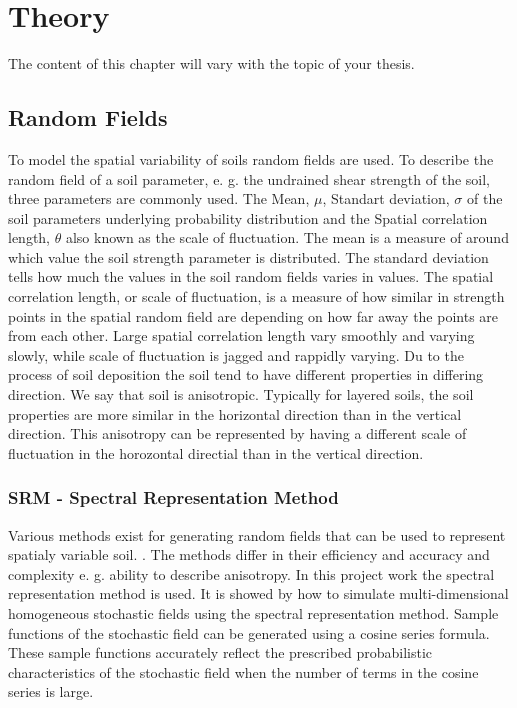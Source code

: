 \chapter[Theory]{Theory}
The content of this chapter will vary with the topic of your thesis. 

\section{Random Fields}

To model the spatial variability of soils random fields are used. To describe the random field of a soil parameter, e. g. the undrained shear strength of the soil, three parameters are commonly used. 
The Mean, $\mu$, Standart deviation, $\sigma$ of the soil parameters underlying probability distribution and the Spatial correlation length, $\theta$ also known as the scale of fluctuation.   
The mean is a measure of around which value the soil strength parameter is distributed. The standard deviation tells how much the values in the soil random fields varies in values. The spatial correlation length, or scale of fluctuation, is a measure of how similar in strength points in the spatial random field are depending on how far away the points are from each other. Large spatial correlation length vary smoothly and varying slowly, while scale of fluctuation is jagged and rappidly varying. 
Du to the process of soil deposition the soil tend to have different properties in differing direction. We say that soil is anisotropic. Typically for layered soils, the soil properties are more similar in the horizontal direction than in the vertical direction. This anisotropy can be represented by having a different scale of fluctuation in the horozontal directial than in the vertical direction.

\subsection{SRM - Spectral Representation Method}

Various methods exist for generating random fields that can be used to represent spatialy variable soil. \citep*[see e. g.][Chapter 6]{fenton2008risk}. The methods differ in their efficiency and accuracy and complexity e. g. ability to describe anisotropy.
In this project work the spectral representation method is used. It is showed by \citet*{shinozuka1996simulation} how to simulate multi-dimensional homogeneous stochastic fields using the spectral representation method. 
Sample functions of the stochastic field can be generated using a cosine series formula. These sample functions accurately reflect the prescribed probabilistic characteristics of the stochastic field when the number of terms in the cosine series is large.

